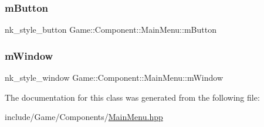 \subsubsection{\texorpdfstring{m\+Button}{mButton}}
{\footnotesize\ttfamily nk\+\_\+style\+\_\+button Game\+::\+Component\+::\+Main\+Menu\+::m\+Button}

\mbox{\label{class_game_1_1_component_1_1_main_menu_a2c8b00fefeff1145c56bda79bdbe556f}} 
\subsubsection{\texorpdfstring{m\+Window}{mWindow}}
{\footnotesize\ttfamily nk\+\_\+style\+\_\+window Game\+::\+Component\+::\+Main\+Menu\+::m\+Window}



The documentation for this class was generated from the following file\+:\begin{DoxyCompactItemize}
\item 
include/\+Game/\+Components/\mbox{\hyperlink{_main_menu_8hpp}{Main\+Menu.\+hpp}}\end{DoxyCompactItemize}
